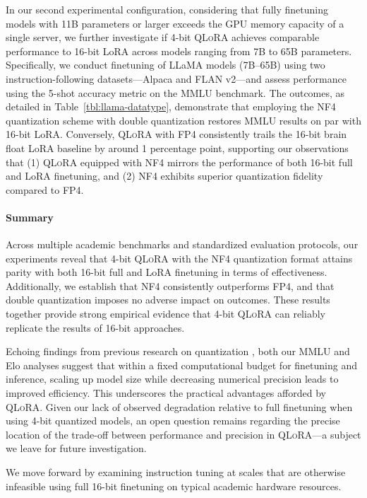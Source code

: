 In our second experimental configuration, considering that fully finetuning models with 11B parameters or larger exceeds the GPU memory capacity of a single server, we further investigate if 4-bit \textsc{QLoRA} achieves comparable performance to 16-bit LoRA across models ranging from 7B to 65B parameters. Specifically, we conduct finetuning of LLaMA models (7B--65B) using two instruction-following datasets—Alpaca and FLAN v2—and assess performance using the 5-shot accuracy metric on the MMLU benchmark. The outcomes, as detailed in Table~\ref{tbl:llama-datatype}, demonstrate that employing the NF4 quantization scheme with double quantization restores MMLU results on par with 16-bit LoRA. Conversely, \textsc{QLoRA} with FP4 consistently trails the 16-bit brain float LoRA baseline by around 1 percentage point, supporting our observations that (1) \textsc{QLoRA} equipped with NF4 mirrors the performance of both 16-bit full and LoRA finetuning, and (2) NF4 exhibits superior quantization fidelity compared to FP4.

\paragraph{Summary} Across multiple academic benchmarks and standardized evaluation protocols, our experiments reveal that 4-bit \textsc{QLoRA} with the NF4 quantization format attains parity with both 16-bit full and LoRA finetuning in terms of effectiveness. Additionally, we establish that NF4 consistently outperforms FP4, and that double quantization imposes no adverse impact on outcomes. These results together provide strong empirical evidence that 4-bit \textsc{QLoRA} can reliably replicate the results of 16-bit approaches.

Echoing findings from previous research on quantization \citep{dettmers2022case}, both our MMLU and Elo analyses suggest that within a fixed computational budget for finetuning and inference, scaling up model size while decreasing numerical precision leads to improved efficiency. This underscores the practical advantages afforded by \textsc{QLoRA}. Given our lack of observed degradation relative to full finetuning when using 4-bit quantized models, an open question remains regarding the precise location of the trade-off between performance and precision in \textsc{QLoRA}—a subject we leave for future investigation.

We move forward by examining instruction tuning at scales that are otherwise infeasible using full 16-bit finetuning on typical academic hardware resources.

